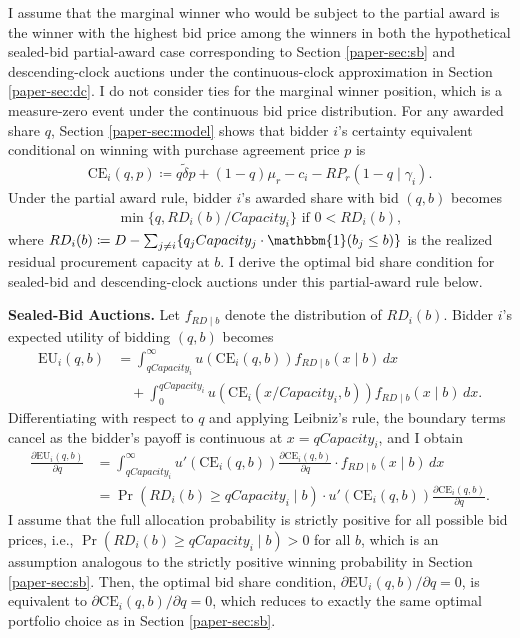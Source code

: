 \documentclass[12pt]{article}
\theoremstyle{definition} %
\newcommand{\I}{\mathbbm{1}}
\begin{document}
I assume that the marginal winner who would be subject to the partial award is the winner with the highest bid price among the winners in both the hypothetical sealed-bid partial-award case corresponding to Section \ref{paper-sec:sb} and descending-clock auctions under the continuous-clock approximation in Section \ref{paper-sec:dc}. I do not consider ties for the marginal winner position, which is a measure-zero event under the continuous bid price distribution. For any awarded share $q$, Section \ref{paper-sec:model} shows that bidder $i$'s certainty equivalent conditional on winning with purchase agreement price $p$ is
\begin{align*}
\mathrm{CE}_i(q,p) \coloneqq q \tilde{\delta} p + (1 - q) \mu_r - c_i - RP_r(1-q \mid \gamma_i).
\end{align*}
Under the partial award rule, bidder $i$'s awarded share with bid $(q,b)$ becomes
\begin{align*}
\min \{ q, RD_i(b)/Capacity_i \} \text{ if } 0 < RD_i(b),
\end{align*}
where $RD_i(b) \coloneqq D - \sum_{j \neq i} \{ q_j Capacity_j \cdot \I(b_j \leq b) \}$ is the realized residual procurement capacity at $b$. I derive the optimal bid share condition for sealed-bid and descending-clock auctions under this partial-award rule below.

\textbf{Sealed-Bid Auctions.}
Let $f_{RD \mid b}$ denote the distribution of $RD_i(b)$. Bidder $i$'s expected utility of bidding $(q,b) $ becomes
\begin{align*}
\mathrm{EU}_i(q, b) &= \int_{q Capacity_i}^{\infty} u(\mathrm{CE}_i(q, b)) f_{RD \mid b}(x \mid b) \, dx \\
&\quad + \int_{0}^{q Capacity_i} u(\mathrm{CE}_i(x/Capacity_i, b)) f_{RD \mid b}(x \mid b) \, dx.
\end{align*}
Differentiating with respect to $q$ and applying Leibniz's rule, the boundary terms cancel as the bidder's payoff is continuous at $x=q Capacity_i$, and I obtain
\begin{align*}
\frac{\partial \mathrm{EU}_i(q, b)}{\partial q} &= \int_{q Capacity_i}^{\infty} u'(\mathrm{CE}_i(q, b)) \frac{\partial \mathrm{CE}_i(q, b)}{\partial q} \cdot f_{RD \mid b}(x \mid b) \, dx\\
&= \Pr(RD_i(b) \geq q Capacity_i \mid b) \cdot u'(\mathrm{CE}_i(q, b)) \frac{\partial \mathrm{CE}_i(q, b)}{\partial q}.
\end{align*}
I assume that the full allocation probability is strictly positive for all possible bid prices, i.e., $\Pr(RD_i(b) \geq q Capacity_i \mid b) > 0$ for all $b$, which is an assumption analogous to the strictly positive winning probability in Section \ref{paper-sec:sb}. Then, the optimal bid share condition, $\partial \mathrm{EU}_i(q, b)/\partial q = 0$, is equivalent to $\partial \mathrm{CE}_i(q, b)/\partial q = 0$, which reduces to exactly the same optimal portfolio choice as in Section \ref{paper-sec:sb}.
\end{document}

